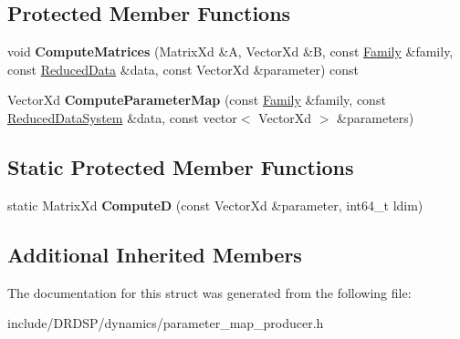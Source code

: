 \subsection*{Protected Member Functions}
\begin{DoxyCompactItemize}
\item 
\hypertarget{struct_d_r_d_s_p_1_1_parameter_map_producer_a3f9de30fef28ea3f175f734c6f162aae}{void {\bfseries Compute\-Matrices} (Matrix\-Xd \&A, Vector\-Xd \&B, const \hyperlink{struct_d_r_d_s_p_1_1_family}{Family} \&family, const \hyperlink{struct_d_r_d_s_p_1_1_reduced_data}{Reduced\-Data} \&data, const Vector\-Xd \&parameter) const }\label{struct_d_r_d_s_p_1_1_parameter_map_producer_a3f9de30fef28ea3f175f734c6f162aae}

\item 
\hypertarget{struct_d_r_d_s_p_1_1_parameter_map_producer_a71ea46d936b75012e524a305e247b6dd}{Vector\-Xd {\bfseries Compute\-Parameter\-Map} (const \hyperlink{struct_d_r_d_s_p_1_1_family}{Family} \&family, const \hyperlink{struct_d_r_d_s_p_1_1_reduced_data_system}{Reduced\-Data\-System} \&data, const vector$<$ Vector\-Xd $>$ \&parameters)}\label{struct_d_r_d_s_p_1_1_parameter_map_producer_a71ea46d936b75012e524a305e247b6dd}

\end{DoxyCompactItemize}
\subsection*{Static Protected Member Functions}
\begin{DoxyCompactItemize}
\item 
\hypertarget{struct_d_r_d_s_p_1_1_parameter_map_producer_a5efd5118906a3d8e0a84dc927dc95000}{static Matrix\-Xd {\bfseries Compute\-D} (const Vector\-Xd \&parameter, int64\-\_\-t ldim)}\label{struct_d_r_d_s_p_1_1_parameter_map_producer_a5efd5118906a3d8e0a84dc927dc95000}

\end{DoxyCompactItemize}
\subsection*{Additional Inherited Members}


The documentation for this struct was generated from the following file\-:\begin{DoxyCompactItemize}
\item 
include/\-D\-R\-D\-S\-P/dynamics/parameter\-\_\-map\-\_\-producer.\-h\end{DoxyCompactItemize}
